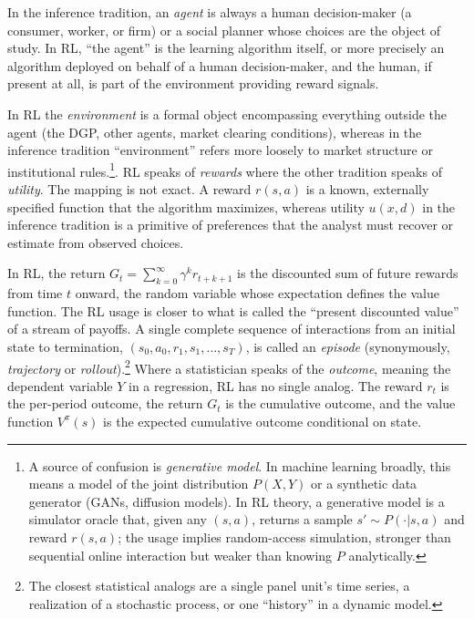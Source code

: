 In the inference tradition, an \textit{agent} is always a human decision-maker (a consumer, worker, or firm) or a social planner whose choices are the object of study. In RL, ``the agent'' is the learning algorithm itself, or more precisely an algorithm deployed on behalf of a human decision-maker, and the human, if present at all, is part of the environment providing reward signals.

In RL the \textit{environment} is a formal object encompassing everything outside the agent (the DGP, other agents, market clearing conditions), whereas in the inference tradition ``environment'' refers more loosely to market structure or institutional rules.\footnote{A source of confusion is \textit{generative model}. In machine learning broadly, this means a model of the joint distribution $P(X, Y)$ or a synthetic data generator (GANs, diffusion models). In RL theory, a generative model is a simulator oracle that, given any $(s,a)$, returns a sample $s' \sim P(\cdot|s,a)$ and reward $r(s,a)$; the usage implies random-access simulation, stronger than sequential online interaction but weaker than knowing $P$ analytically.}. RL speaks of \textit{rewards} where the other tradition speaks of \textit{utility}. The mapping is not exact. A reward $r(s,a)$ is a known, externally specified function that the algorithm maximizes, whereas utility $u(x,d)$ in the inference tradition is a primitive of preferences that the analyst must recover or estimate from observed choices.

In RL, the return $G_t = \sum_{k=0}^{\infty} \gamma^k r_{t+k+1}$ is the discounted sum of future rewards from time $t$ onward, the random variable whose expectation defines the value function. The RL usage is closer to what is called the ``present discounted value'' of a stream of payoffs. A single complete sequence of interactions from an initial state to termination, $(s_0, a_0, r_1, s_1, \ldots, s_T)$, is called an \textit{episode} (synonymously, \textit{trajectory} or \textit{rollout}).\footnote{The closest statistical analogs are a single panel unit's time series, a realization of a stochastic process, or one ``history'' in a dynamic model.} Where a statistician speaks of the \textit{outcome}, meaning the dependent variable $Y$ in a regression, RL has no single analog. The reward $r_t$ is the per-period outcome, the return $G_t$ is the cumulative outcome, and the value function $V^\pi(s)$ is the expected cumulative outcome conditional on state.

